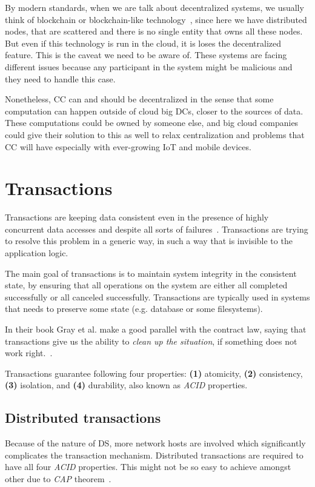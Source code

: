 By modern standards, when we are talk about decentralized systems, we usually think of blockchain or blockchain-like technology~\cite{LeibleSSG19}, since here we have distributed nodes, that are scattered and there is no single entity that owns all these nodes. But even if this technology is run in the cloud, it is loses the decentralized feature. This is the caveat we need to be aware of. These systems are facing different issues because any participant in the system might be malicious and they need to handle this case. 

Nonetheless, CC can and should be decentralized in the sense that some computation can happen outside of cloud big DCs, closer to the sources of data. These computations could be owned by someone else, and big cloud companies could give their solution to this as well to relax centralization and problems that CC will have especially with ever-growing IoT and mobile devices.
%
%
\section{Transactions}\label{sec:transactions}
%
Transactions are keeping data consistent even in the presence of highly concurrent data accesses and despite all sorts of failures~\cite{WeikumV2002}. Transactions are trying to resolve this problem in a generic way, in such a way that is invisible to the application logic.

The main goal of transactions is to maintain system integrity in the consistent state, by ensuring that all operations on the system are either all completed successfully or all canceled successfully. Transactions are typically used in systems that needs to preserve some state (e.g. database or some filesystems). 

In their book Gray et al. make a good parallel with the contract law, saying that transactions give us the ability to \emph{clean up the situation}, if something does not work right.~\cite{GrayR93}.

Transactions guarantee following four properties: \textbf{(1)} atomicity, \textbf{(2)} consistency, \textbf{(3)} isolation, and \textbf{(4)} durability, also known as \emph{ACID} properties.
%
%
\subsection{Distributed transactions}\label{sec:distributed_transactions}
%
Because of the nature of DS, more network hosts are involved which significantly complicates the transaction mechanism. Distributed transactions are required to have all four \emph{ACID} properties. This might not be so easy to achieve amongst other due to \emph{CAP} theorem~\pageref{lab:cap}. 

